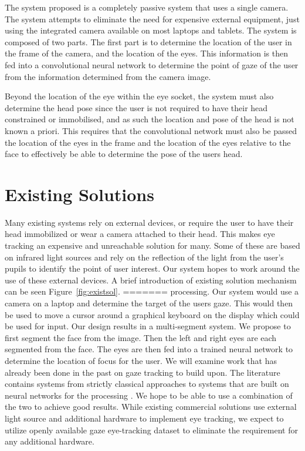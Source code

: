 \documentclass[10pt,twocolumn,letterpaper]{article}
\begin{document}
The system proposed is a completely passive system that uses a single
camera. The system attempts to eliminate the need for expensive
external equipment, just using the integrated camera available on most
laptops and tablets. The system is composed of two parts. The first
part is to determine the location of the user in the frame of the camera, and the
location of the eyes. This information is then fed into a
convolutional neural network to determine the point of gaze of the
user from the information determined from the camera image.

Beyond the location of the eye within the eye socket, the system must
also determine the head pose since the user is not required to have
their head constrained or immobilised, and as such the location and
pose of the head is not known a priori. This requires that the
convolutional network must also be passed the location of the eyes in
the frame and the location of the eyes relative to the face to effectively be
able to determine the pose of the users head.


\section{Existing Solutions}
Many existing systems rely on external
devices\cite{eyetrackerlist}\cite{tobii_1}, or require the user to
have their head immobilized or wear a camera attached to their
head. This makes eye tracking an expensive and unreachable solution
for many. Some of these are based on infrared light sources and rely
on the reflection of the light from the user's pupils to identify the
point of user interest. Our system hopes to work around the use of
these external devices. A brief introduction of existing solution
mechanism can be seen Figure~\ref{fig:existsol}.
=======
processing. Our system would use a camera on a laptop and determine
the target of the users gaze. This would then be used to move a cursor
around a graphical keyboard on the display which could be used for
input. Our design results in a multi-segment system. We propose to
first segment the face from the image. Then the left and right eyes
are each segmented from the face. The eyes are then fed into a trained
neural network to determine the location of focus for the user. We
will examine work that has already been done in the past on gaze
tracking to build upon. The literature contains systems from strictly
classical approaches to systems that are built on neural networks for
the processing \cite{krafka} \cite{mcmurrough} \cite{weidenbacher}
\cite{baluja} \cite{cazzato} \cite{li}. We hope to be able to use a
combination of the two to achieve good results. While existing
commercial solutions use external light source and additional hardware
to implement eye tracking, we expect to utilize openly available gaze
eye-tracking dataset to eliminate the requirement for any additional
hardware.
\end{document}
